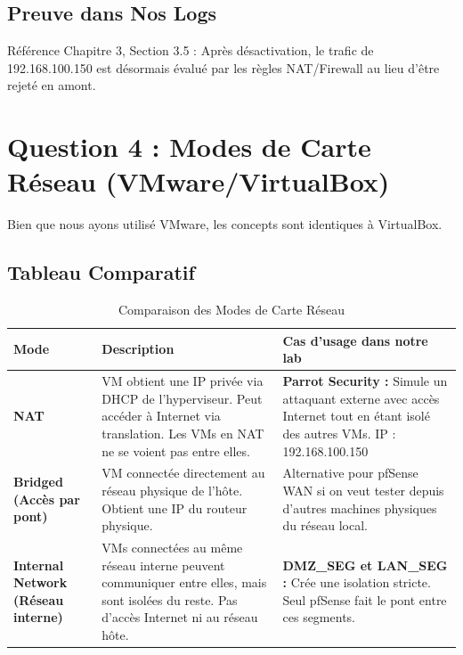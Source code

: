 \documentclass[12pt,a4paper,openany]{report}
\newcommand{\tableheadcolor}{\rowcolor{tableheadbg}}
\begin{document}
	\subsection{Preuve dans Nos Logs}
	Référence Chapitre 3, Section 3.5 : Après désactivation, le trafic de 192.168.100.150 est désormais évalué par les règles NAT/Firewall au lieu d'être rejeté en amont.
	
	\section{Question 4 : Modes de Carte Réseau (VMware/VirtualBox)}
	
	Bien que nous ayons utilisé VMware, les concepts sont identiques à VirtualBox.
	
	\subsection{Tableau Comparatif}
	
	\begin{table}[H]
		\centering
		\small
		\renewcommand{\arraystretch}{1.8}
		\setlength{\arrayrulewidth}{0.5pt}
		\begin{tabular}{p{3.5cm} p{5cm} p{6cm}}
			\arrayrulecolor{tableborder}
			\hline
			\tableheadcolor
			\textcolor{tableheadfg}{\textbf{Mode}} &
			\textcolor{tableheadfg}{\textbf{Description}} &
			\textcolor{tableheadfg}{\textbf{Cas d'usage dans notre lab}} \\
			\hline
			\rowcolor{tablerowalt}
			\textbf{NAT} & 
			VM obtient une IP privée via DHCP de l'hyperviseur. Peut accéder à Internet via translation. Les VMs en NAT ne se voient pas entre elles. &
			\textbf{Parrot Security :} Simule un attaquant externe avec accès Internet tout en étant isolé des autres VMs. IP : 192.168.100.150 \\
			
			\textbf{Bridged (Accès par pont)} &
			VM connectée directement au réseau physique de l'hôte. Obtient une IP du routeur physique. &
			Alternative pour pfSense WAN si on veut tester depuis d'autres machines physiques du réseau local. \\
			
			\rowcolor{tablerowalt}
			\textbf{Internal Network (Réseau interne)} &
			VMs connectées au même réseau interne peuvent communiquer entre elles, mais sont isolées du reste. Pas d'accès Internet ni au réseau hôte. &
			\textbf{DMZ\_SEG et LAN\_SEG :} Crée une isolation stricte. Seul pfSense fait le pont entre ces segments. \\
			\hline
		\end{tabular}
		\caption{Comparaison des Modes de Carte Réseau}
	\end{table}
	
\end{document}
